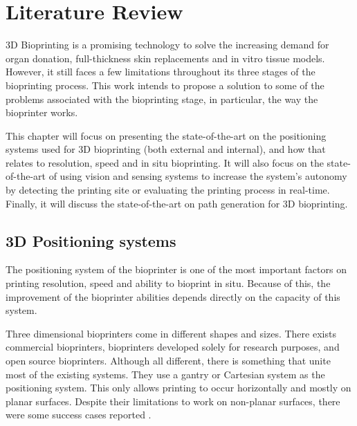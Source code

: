 
\chapter{Literature Review}
\label{cha:literature_review}

3D Bioprinting is a promising technology to solve the increasing demand for organ donation, full-thickness skin replacements and in vitro tissue models. However, it still faces a few limitations throughout its three stages of the bioprinting process. This work intends to propose a solution to some of the problems associated with the bioprinting stage, in particular, the way the bioprinter works.

This chapter will focus on presenting the state-of-the-art on the positioning systems used for 3D bioprinting (both external and internal), and how that relates to resolution, speed and in situ bioprinting. It will also focus on the state-of-the-art of using vision and sensing systems to increase the system's autonomy by detecting the printing site or evaluating the printing process in real-time. Finally, it will discuss the state-of-the-art on path generation for 3D bioprinting.


\section{3D Positioning systems}
\label{sec:3d_positioning_systems}

The positioning system of the bioprinter is one of the most important factors on printing resolution, speed and ability to bioprint in situ. Because of this, the improvement of the bioprinter abilities depends directly on the capacity of this system.

Three dimensional bioprinters come in different shapes and sizes. There exists commercial bioprinters, bioprinters developed solely for research purposes, and open source bioprinters. Although all different, there is something that unite most of the existing systems. They use a gantry or Cartesian system as the positioning system. This only allows printing to occur horizontally and mostly on planar surfaces. Despite their limitations to work on non-planar surfaces, there were some success cases reported \cite{Lee2009_multi_layer_culture_human_skin_non_planar}.

